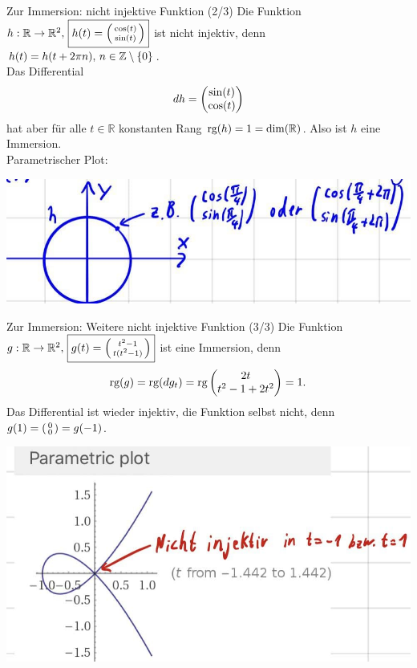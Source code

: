 \begin{Beispiel}
{Zur Immersion: nicht injektive Funktion (2/3)}
Die Funktion $h:\mathbb{R}\to\mathbb{R}^2,\,\boxed{h(t)=\left(\begin{smallmatrix}\cos(t)\\\sin(t)\end{smallmatrix}\right)}$ ist nicht injektiv, denn $h(t)=h(t+2\pi n),\,n\in\mathbb{Z}\setminus\left\{0\right\}$.\\
Das Differential
\begin{equation*}
    dh=\begin{pmatrix}\sin(t)\\\cos(t)\end{pmatrix}
\end{equation*}
hat aber für alle $t\in\mathbb{R}$ konstanten Rang $\text{rg}(h)=1=\dim(\mathbb{R})$. Also ist $h$ eine Immersion.\\
Parametrischer Plot:
\begin{center}
    \includegraphics[width=.5\textwidth]{Dateien/10/10Immersion2.jpg}
\end{center}
\end{Beispiel}

\begin{Beispiel}
{Zur Immersion: Weitere nicht injektive Funktion (3/3)}
Die Funktion $g:\mathbb{R}\to\mathbb{R}^2,\,\boxed{g(t)=\left(\begin{smallmatrix}t^2-1\\t(t^2-1)\end{smallmatrix}\right)}$ ist eine Immersion, denn
\begin{equation*}
    \text{rg}(g)=\text{rg}(dg_t)=\text{rg}\begin{pmatrix}2t\\t^2-1+2t^2\end{pmatrix}=1.
\end{equation*}
Das Differential ist wieder injektiv, die Funktion selbst nicht, denn $g(1)=\left(\begin{smallmatrix}0\\0\end{smallmatrix}\right)=g(-1)$. \Lightning
\begin{center}
    \includegraphics[width=.35\textwidth]{Dateien/10/10Immersion3.jpg}
\end{center}
\end{Beispiel}

